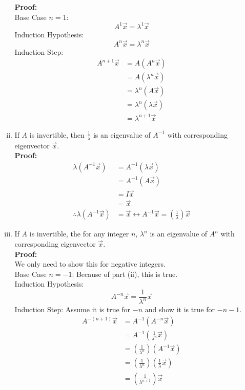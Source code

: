 \documentclass{math}
\begin{document}
\begin{enumerate}[Theorem 1.]
\begin{enumerate}[(i)]
    \textbf{Proof:} \\
    Base Case \( n = 1 \):
    \[ A^1\vec{x} = \lambda^1\vec{x} \]
    Induction Hypothesis:
    \[ A^n\vec{x} = \lambda^n\vec{x} \]
    Induction Step:
    \begin{align*}
      A^{n+1}\vec{x} &= A(A^n\vec{x}) \\
      &= A(\lambda^n\vec{x}) \\
      &= \lambda^n(A\vec{x}) \\
      &= \lambda^n(\lambda\vec{x}) \\
      &= \lambda^{n+1}\vec{x}
    \end{align*}
    \item If \( A \) is invertible, then \( \frac{1}{\lambda} \) is an
    eigenvalue of \( A^{-1} \) with corresponding eigenvector \( \vec{x} \). \\
    \textbf{Proof:}
    \begin{align*}
      \lambda(A^{-1}\vec{x}) &= A^{-1}(\lambda\vec{x}) \\
      &= A^{-1}(A\vec{x}) \\
      &= I\vec{x} \\
      &= \vec{x} \\
      \therefore \lambda(A^{-1}\vec{x}) &= \vec{x} \leftrightarrow
        A^{-1}\vec{x} = (\frac{1}{\lambda})\vec{x}
    \end{align*}
    \item If \( A \) is invertible, the for any integer \( n \), \( \lambda^n \)
    is an eigenvalue of \( A^n \) with corresponding eigenvector
    \( \vec{x} \). \\
    \textbf{Proof:} \\
    We only need to show this for negative integers. \\
    Base Case \( n = -1 \): Because of part (ii), this is true. \\
    Induction Hypothesis:
    \[ A^{-n}\vec{x} = \frac{1}{\lambda^n}\vec{x} \]
    Induction Step: Assume it is true for \( -n \) and show it is true for
    \( -n-1 \).
    \begin{align*}
      A^{-(n+1)}\vec{x} &= A^{-1}(A^{-n}\vec{x}) \\
      &= A^{-1}(\frac{1}{\lambda^n}\vec{x}) \\
      &= (\frac{1}{\lambda^n})(A^{-1}\vec{x}) \\
      &= (\frac{1}{\lambda^n})(\frac{1}{\lambda}\vec{x}) \\
      &= (\frac{1}{\lambda^{n+1}})\vec{x}
    \end{align*}

\end{enumerate}
\end{enumerate}
\end{document}
